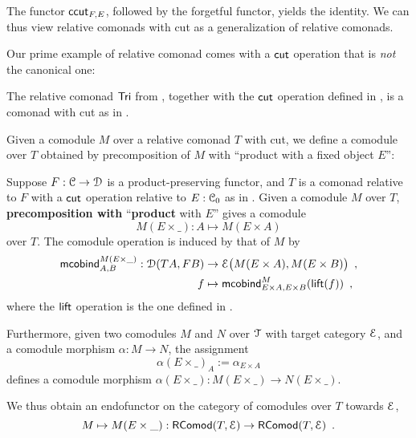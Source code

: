 \documentclass[a4paper,USenglish]{lipics}
\newcommand{\fat}[1]{\textbf{#1}}
\begin{document}
The functor $\mathsf{ccut}_{F,E}$, followed by the forgetful functor, yields the identity. We can thus view
relative comonads with cut as a generalization of relative comonads.

Our prime example of relative comonad comes with a $\mathsf{cut}$ operation that is \emph{not} the canonical one:

\begin{ex}%
\label{def:cut_for_tri}
  The relative comonad $\mathsf{Tri}$ from , together with the $\mathsf{cut}$ operation defined in , 
  is a comonad with cut as in .
\end{ex}





Given a comodule $M$ over a relative comonad $T$ with cut, we define a comodule over $T$ obtained by precomposition of $M$ with
\enquote{product with a fixed object $E$}:


\begin{defn}%
\label{def:product_in_context}
 Suppose $F:{\mathcal{C}}\to\mathcal{D}$ is a product-preserving functor, and $T$ is a comonad relative to $F$ with a $\mathsf{cut}$ operation 
 relative to $E:{\mathcal{C}}_0$ as in .
 Given a comodule $M$ over $T$,  \fat{precomposition with} \enquote{\fat{product} with $E$}
 gives a comodule 
   \[ M(E\times\_) : A \mapsto M(E\times A) \] over $T$.
 The comodule operation is induced by that of $M$ by 
 \begin{align*} \mathsf{mcobind}^{M(E\times\_)}_{A,B} : \mathcal{D}(TA,FB)&\to \mathcal{E}\bigl(M(E\times A), M(E\times B)\bigr) \enspace ,\\ 
                                                      f &\mapsto \mathsf{mcobind}^M_{E\times A,E\times B}(\mathsf{lift}(f)) \enspace ,
  \end{align*}                                        
where the $\mathsf{lift}$ operation is the one defined in .
 
 Furthermore, given two comodules $M$ and $N$ over $\mathcal{T}$ with target category $\mathcal{E}$, and a comodule morphism $\alpha : M \to N$,  
 the assignment \[ \alpha(E \times \_)_A := \alpha_{E\times A} \] defines a comodule morphism 
  $\alpha(E\times \_) : M(E\times \_) \to N(E\times \_) $.

  \noindent
  We thus obtain an endofunctor on the category of comodules over $T$ towards $\mathcal{E}$,
   \[ M \mapsto  M (E\times \_) : \mathsf{RComod}(T,\mathcal{E}) \to \mathsf{RComod}(T,\mathcal{E}) \enspace . \]
\end{defn}
\end{document}
